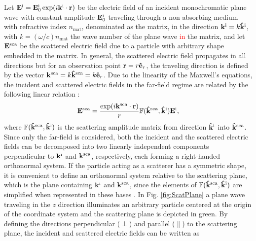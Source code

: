 
Let $\vb{E}^\text{i} = \vb{E}^\text{i}_0 \exp(i\vb{k}^\text{i}\cdot\vb{r})$ be the electric field of an incident monochromatic plane wave with constant amplitude $\vb{E}_0^\text{i}$  traveling through a non absorbing medium with refractive index $n_\text{mat}$, denominated as the matrix, in the direction $\vb{k}^\text{i} = k\vu{k}^\text{i}$, with $k = (\omega/c)n_\text{mat}$ the wave number of the plane wave \textcolor{red}{in} the matrix, and let $\vb{E}^\text{sca}$ be the scattered electric field due to a particle with arbitrary shape embedded in the matrix. In general, the scattered electric field propagates in all directions but for an observation point $\vb{r} = r\vu{e}_r$, the traveling direction is defined by the vector $\vb{k}^\text{sca} = k\vu{k}^\text{sca} = k\vu{e}_r$.  Due to the linearity of the Maxwell's equations,   the incident and scattered electric fields  in the far-field regime are related by the following linear relation \cite{tsang_scattering_2000}:
%
%
 \begin{equation}
	\vb{E}^\text{sca} =   \frac{\exp(i\vb{k}^\text{sca}\cdot\vb{r})}{r} \mathbb{F}(\vu{k}^\text{sca}, \vu{k}^\text{i}) \vb{E}^\text{i},
 \label{eq:ScatAmpMat}
 \end{equation}
%
where $\mathbb{F}(\vu{k}^\text{sca}, \vu{k}^\text{i})$ is the scattering  amplitude matrix from direction $\vu{k}^\text{i}$ into $\vu{k}^\text{sca}$. Since only the far-field is considered, both the incident and the scattered electric fields can be decomposed into two linearly independent components perpendicular to $\vb{k}^\text{i}$ and $\vb{k}^\text{sca}$, respectively, each forming a right-handed orthonormal system. If the particle acting as a scatterer has a symmetric shape, it is convenient to define an orthonormal system relative to the scattering plane, which is the plane containing $\vb{k}^\text{i}$ and $\vb{k}^\text{sca}$, since the elements of $\mathbb{F}(\vu{k}^\text{sca}, \vu{k}^\text{i})$ are simplified when represented in these bases \cite{tsang_scattering_2000}. In Fig. \ref{fig:ScatPlane} a plane wave traveling in the $z$ direction illuminates an arbitrary particle centered at the origin of the coordinate system and the scattering plane is depicted in green. By defining the directions perpendicular  ($\perp$) and parallel ($\parallel$) to the scattering plane,  the incident and scattered electric fields can be written as
